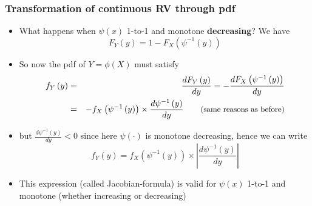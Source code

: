 \documentclass[notes=show,smaller,handout]{beamer}
\newenvironment{stepitemize}{\begin{itemize}[<+->]}{\end{itemize} }
\begin{document}
\begin{frame}%

\frametitle{Transformation of continuous RV through pdf }

\begin{stepitemize}
\item What happens when $\psi \left( x\right) $ 1-to-1 and monotone \textbf{%
decreasing}? We have%
\begin{equation*}
F_{Y}\left( y\right) =1-F_{X}\left( \psi ^{-1}\left( y\right) \right)
\end{equation*}

\item So now the pdf of $Y=\phi \left( X\right) $ must satisfy 
\begin{eqnarray*}
f_{Y}\left( y\right) &=&\frac{dF_{Y}\left( y\right) }{dy}=-\frac{%
dF_{X}\left( \psi ^{-1}\left( y\right) \right) }{dy} \\
&=&-f_{X}\left( \psi ^{-1}\left( y\right) \right) \times \frac{d\psi
^{-1}\left( y\right) }{dy}\qquad \text{{\small (same reasons as before)}}
\end{eqnarray*}

\item but $\frac{d\psi ^{-1}\left( y\right) }{dy}<0$ since here $\psi \left(
\cdot \right) $ is monotone decreasing, hence we can write%
\begin{equation*}
f_{Y}\left( y\right) =f_{X}\left( \psi ^{-1}\left( y\right) \right) \times
\left\vert \frac{d\psi ^{-1}\left( y\right) }{dy}\right\vert
\end{equation*}

\item This expression (called Jacobian-formula) is valid for $\psi \left( x\right) $ 1-to-1 and
monotone (whether increasing or decreasing)
\end{stepitemize}

\end{frame}%
\end{document}
